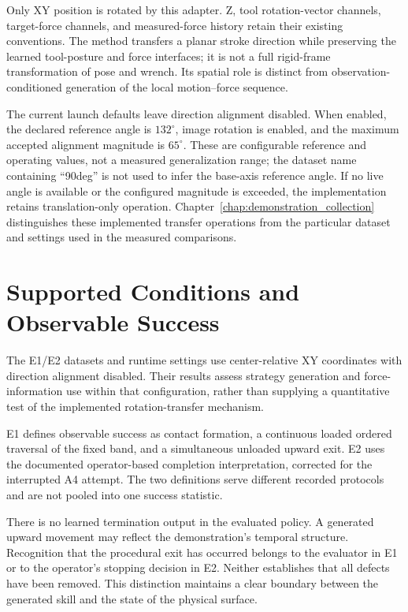 Only XY position is rotated by this adapter. Z, tool rotation-vector channels, target-force channels, and measured-force history retain their existing conventions. The method transfers a planar stroke direction while preserving the learned tool-posture and force interfaces; it is not a full rigid-frame transformation of pose and wrench. Its spatial role is distinct from observation-conditioned generation of the local motion--force sequence.

The current launch defaults leave direction alignment disabled. When enabled, the declared reference angle is \(132^\circ\), image rotation is enabled, and the maximum accepted alignment magnitude is \(65^\circ\). These are configurable reference and operating values, not a measured generalization range; the dataset name containing ``90deg'' is not used to infer the base-axis reference angle. If no live angle is available or the configured magnitude is exceeded, the implementation retains translation-only operation. Chapter~\ref{chap:demonstration_collection} distinguishes these implemented transfer operations from the particular dataset and settings used in the measured comparisons.

\section{Supported Conditions and Observable Success}
The E1/E2 datasets and runtime settings use center-relative XY coordinates with direction alignment disabled. Their results assess strategy generation and force-information use within that configuration, rather than supplying a quantitative test of the implemented rotation-transfer mechanism.

E1 defines observable success as contact formation, a continuous loaded ordered traversal of the fixed band, and a simultaneous unloaded upward exit. E2 uses the documented operator-based completion interpretation, corrected for the interrupted A4 attempt. The two definitions serve different recorded protocols and are not pooled into one success statistic.

There is no learned termination output in the evaluated policy. A generated upward movement may reflect the demonstration's temporal structure. Recognition that the procedural exit has occurred belongs to the evaluator in E1 or to the operator's stopping decision in E2. Neither establishes that all defects have been removed. This distinction maintains a clear boundary between the generated skill and the state of the physical surface.
